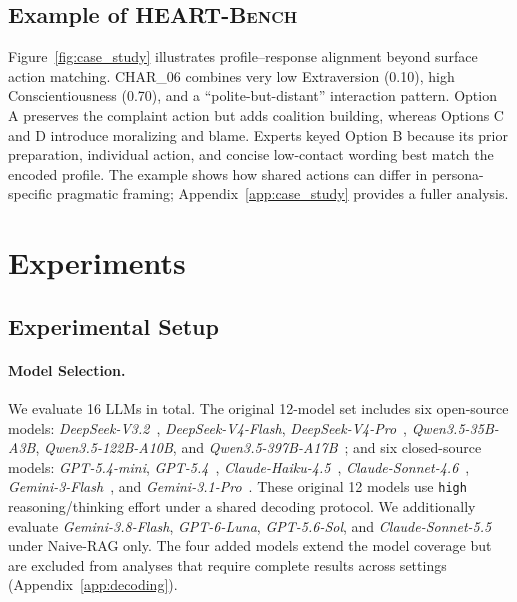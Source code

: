 \documentclass[11pt]{article}
\newcommand{\ourbench}[0]{\textsc{HEART-Bench}\xspace}
\begin{document}
\subsection{Example of \ourbench}
Figure~\ref{fig:case_study} illustrates profile--response alignment beyond surface action matching. CHAR\_06 combines very low Extraversion (0.10), high Conscientiousness (0.70), and a ``polite-but-distant'' interaction pattern. Option A preserves the complaint action but adds coalition building, whereas Options C and D introduce moralizing and blame. Experts keyed Option B because its prior preparation, individual action, and concise low-contact wording best match the encoded profile. The example shows how shared actions can differ in persona-specific pragmatic framing; Appendix~\ref{app:case_study} provides a fuller analysis.

\label{gen_inst}

\section{Experiments}

\subsection{Experimental Setup}

\paragraph{Model Selection.}
We evaluate 16 LLMs in total. The original 12-model set includes six open-source models: \textit{DeepSeek-V3.2}~\cite{deepseek_v3_2_2025}, \textit{DeepSeek-V4-Flash}, \textit{DeepSeek-V4-Pro}~\cite{deepseek_v4_2026}, \textit{Qwen3.5-35B-A3B}, \textit{Qwen3.5-122B-A10B}, and \textit{Qwen3.5-397B-A17B}~\cite{qwen35_2026}; and six closed-source models: \textit{GPT-5.4-mini}, \textit{GPT-5.4}~\cite{openai2026gpt54}, \textit{Claude-Haiku-4.5}~\cite{anthropic2025haiku45}, \textit{Claude-Sonnet-4.6}~\cite{anthropic2026sonnet46}, \textit{Gemini-3-Flash}~\cite{google2025gemini3flash}, and \textit{Gemini-3.1-Pro}~\cite{google2026gemini31pro}. These original 12 models use \texttt{high} reasoning/thinking effort under a shared decoding protocol. We additionally evaluate \textit{Gemini-3.8-Flash}, \textit{GPT-6-Luna}, \textit{GPT-5.6-Sol}, and \textit{Claude-Sonnet-5.5} under Naive-RAG only. The four added models extend the model coverage but are excluded from analyses that require complete results across settings (Appendix~\ref{app:decoding}).
\end{document}

